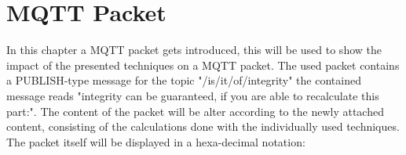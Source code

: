 \section{MQTT Packet}

In this chapter a MQTT packet gets introduced, this will be used to show the impact of the presented techniques on a MQTT packet.
The used packet contains a PUBLISH-type message for the topic "/is/it/of/integrity" the contained message reads "integrity can be guaranteed, if you are able to recalculate this part:".
The content of the packet will be alter according to the newly attached content, consisting of the calculations done with the individually used techniques. \\
\newpage
The packet itself will be displayed in a hexa-decimal notation: \\

